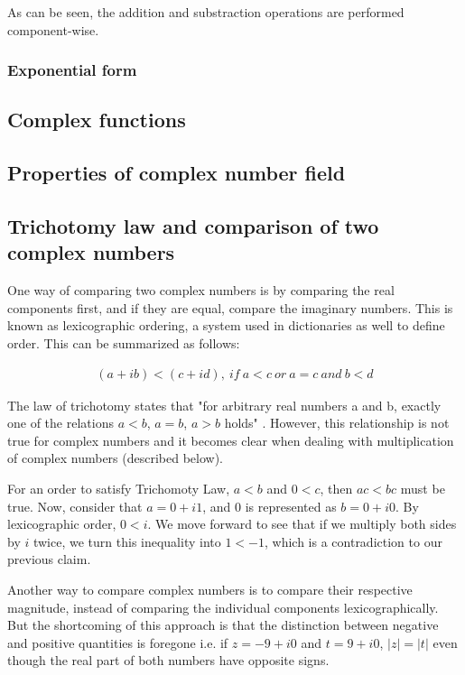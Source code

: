 As can be seen, the addition and substraction operations are performed 
component-wise.




\subsubsection{Exponential form}
\subsection{Complex functions}


\subsection{Properties of complex number field}

\subsection{Trichotomy law and comparison of two complex numbers}
One way of comparing two complex numbers is by comparing the real components first, and if they are equal, compare the imaginary numbers. This is known as lexicographic ordering, a system used in dictionaries as well to define order. This can be summarized as follows:

\begin{equation}
\begin{aligned}
(a+ib) < (c+id), \ if \ a<c \ or \ a=c \ and \ b<d
\end{aligned}
\end{equation}

The law of trichotomy states that "for arbitrary real numbers a and b, exactly one of the relations $a<b$, $a=b$, $a>b$ holds" \cite{trichotomy}. However, this relationship is not true for complex numbers and it becomes clear when dealing with multiplication of complex numbers (described below).

For an order to satisfy Trichomoty Law, $a<b$ and $0<c$, then $ac<bc$ must be true. Now, consider that $a=0+i1$, and $0$ is represented as $b=0+i0$. By lexicographic order, $0<i$. We move forward to see that if we multiply both sides by $i$ twice, we turn this inequality into $1<-1$, which is a contradiction to our previous claim.

Another way to compare complex numbers is to compare their respective magnitude, instead of comparing the individual components lexicographically. But the shortcoming of this approach is that the distinction between negative and positive quantities is foregone i.e. if $z=-9+i0$ and $t=9+i0$, $|z|=|t|$ even though the real part of both numbers have opposite signs.  


